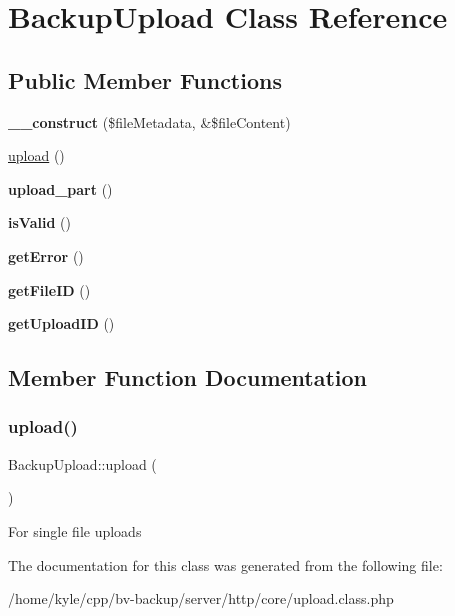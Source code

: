 \hypertarget{class_backup_upload}{}\section{Backup\+Upload Class Reference}
\label{class_backup_upload}
\subsection*{Public Member Functions}
\begin{DoxyCompactItemize}
\item 
\mbox{\label{class_backup_upload_a6166d726b5e228afe6a20d11bc6d9070}} 
{\bfseries \+\_\+\+\_\+construct} (\$file\+Metadata, \&\$file\+Content)
\item 
\hyperlink{class_backup_upload_afb809d66480b6925a4d1905e3237b051}{upload} ()
\item 
\mbox{\label{class_backup_upload_a84facdb1488cde866f017ac2112d9be4}} 
{\bfseries upload\+\_\+part} ()
\item 
\mbox{\label{class_backup_upload_a6438f4537080690e795ea466d01fe217}} 
{\bfseries is\+Valid} ()
\item 
\mbox{\label{class_backup_upload_a2eec48aad82f9f43687a92b47d6c48e6}} 
{\bfseries get\+Error} ()
\item 
\mbox{\label{class_backup_upload_a80397e68071a5d00683b7778f35f5a13}} 
{\bfseries get\+File\+ID} ()
\item 
\mbox{\label{class_backup_upload_a25c99a2c6c6a51e29d6374eb2a69aa2e}} 
{\bfseries get\+Upload\+ID} ()
\end{DoxyCompactItemize}


\subsection{Member Function Documentation}
\mbox{\label{class_backup_upload_afb809d66480b6925a4d1905e3237b051}} 
\subsubsection{\texorpdfstring{upload()}{upload()}}
{\footnotesize\ttfamily Backup\+Upload\+::upload (\begin{DoxyParamCaption}{ }\end{DoxyParamCaption})}

For single file uploads 

The documentation for this class was generated from the following file\+:\begin{DoxyCompactItemize}
\item 
/home/kyle/cpp/bv-\/backup/server/http/core/upload.\+class.\+php\end{DoxyCompactItemize}
